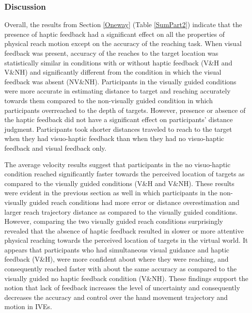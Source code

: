 \subsubsection{Discussion}
Overall, the results from Section \ref{Oneway} (Table \ref{SumPart2}) indicate that the presence of haptic feedback had a significant effect on all the properties of physical reach motion except on the accuracy of the reaching task. When visual feedback was present, accuracy of the reaches to the target location was statistically similar in conditions with or without haptic feedback (V\&H and V\&NH) and significantly different from the condition in which the visual feedback was absent (NV\&NH). Participants in the visually guided conditions were more accurate in estimating distance to target and reaching accurately towards them compared to the non-visually guided condition in which participants overreached to the depth of targets. However, presence or absence of the haptic feedback did not have a significant effect on participants' distance judgment. Participants took shorter distances traveled to reach to the target when they had visuo-haptic feedback than when they had no visuo-haptic feedback and visual feedback only. 

The average velocity results suggest that participants in the no visuo-haptic condition reached significantly faster towards the perceived location of targets as compared to the visually guided conditions (V\&H and V\&NH). These results were evident in the previous section as well in which participants in the non-visually guided reach conditions had more error or distance overestimation and larger reach trajectory distance as compared to the visually guided conditions. However, comparing the two visually guided reach conditions surprisingly revealed that the absence of haptic feedback resulted in slower or more attentive physical reaching towards the perceived location of targets in the virtual world. It appears that participants who had simultaneous visual guidance and haptic feedback (V\&H), were more confident about where they were reaching, and consequently reached faster with about the same accuracy as compared to the visually guided no haptic feedback condition (V\&NH). These findings support the notion that lack of feedback increases the level of uncertainty and consequently decreases the accuracy and control over the hand movement trajectory and motion in IVEs.

